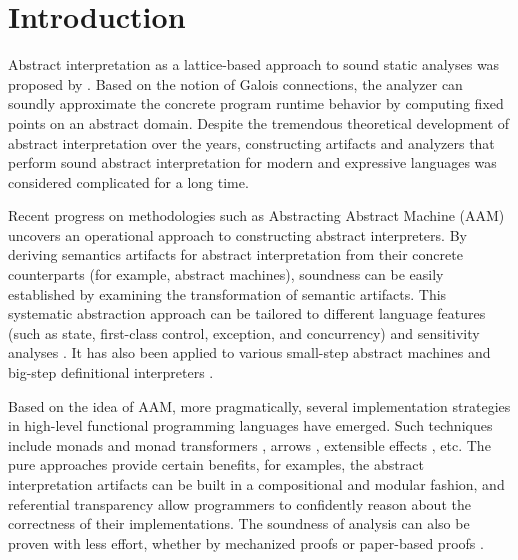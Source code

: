\section{Introduction} \label{intro}

Abstract interpretation as a lattice-based approach to sound static analyses was
proposed by \citet{DBLP:conf/popl/CousotC77, CousotCousot79-1}. Based on the notion of Galois
connections, the analyzer can soundly approximate the
concrete program runtime behavior by computing fixed points on an abstract
domain. Despite the tremendous theoretical development of abstract
interpretation over the years, constructing artifacts and analyzers that perform
sound abstract interpretation for modern and expressive languages was considered
complicated for a long time.

Recent progress on methodologies such as Abstracting Abstract Machine (AAM)
\cite{DBLP:journals/jfp/HornM12, DBLP:conf/icfp/HornM10} uncovers an
operational approach to constructing abstract interpreters.  By deriving
semantics artifacts for abstract interpretation from their concrete
counterparts (for example, abstract machines), soundness can be easily
established by examining the transformation of semantic artifacts.
This systematic abstraction approach can be tailored to different
language features (such as state, first-class control, exception, and
concurrency) and sensitivity analyses \cite{DBLP:conf/icfp/Gilray0M16,
  DBLP:conf/popl/GilrayL0MH16, Darais:2015:GTM:2814270.2814308}. It
has also been applied to various small-step abstract machines
\cite{DBLP:journals/jfp/HornM12, DBLP:conf/icfp/HornM10,
  Sergey:2013:MAI:2491956.2491979} and big-step definitional
interpreters \cite{Wei:2018:RAA:3243631.3236800,
  DBLP:journals/pacmpl/DaraisLNH17, Keidel:2018:CSP:3243631.3236767}.


Based on the idea of AAM, more pragmatically, several implementation strategies
in high-level functional programming languages have emerged.  Such techniques
include monads and monad transformers \cite{DBLP:journals/pacmpl/DaraisLNH17,
Sergey:2013:MAI:2491956.2491979}, arrows
\cite{Keidel:2018:CSP:3243631.3236767}, extensible effects
\cite{Kiselyov:2015:FMM:2804302.2804319, Githubsemantic}, etc. The pure
approaches provide certain benefits, for examples, the abstract interpretation
artifacts can be built in a compositional and modular fashion, and referential
transparency allow programmers to confidently reason about the correctness of
their implementations.  The soundness of analysis can also be proven with less
effort, whether by mechanized proofs \cite{Darais:2016:CGC:2951913.2951934} or
paper-based proofs \cite{Keidel:2018:CSP:3243631.3236767}.  

